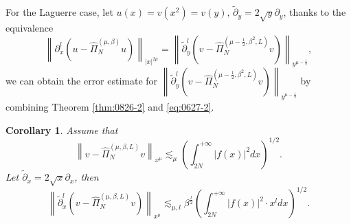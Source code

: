 \documentclass[pdflatex,sn-aps]{sn-jnl}%
\theoremstyle{thmstyleone}%
\newtheorem{corollary}{Corollary}[section]
\theoremstyle{thmstyletwo}%
\theoremstyle{thmstylethree}%
\begin{document}
For the Laguerre case, let $u(x) = v(x^2) = v(y),\, \tilde{\partial}_y = 2\sqrt{y}\partial_y$, thanks to the equivalence
\begin{equation}\label{eq:0627-2}
  \left\|\partial_x^l\left(u-\widehat{\Pi}_{N}^{(\mu,\beta)} u\right)\right\|_{|x|^{2 \mu}}=\left\|\tilde{\partial}_y^l\left(v-\widehat{\Pi}_{N}^{(\mu-\frac{1}{2}, \beta^2, L)} v\right)\right\|_{y^{\mu-\frac{1}{2}}},
\end{equation}
we can obtain the error estimate for $\left\|\tilde{\partial}_y^l\left(v-\widehat{\Pi}_{N}^{(\mu-\frac{1}{2}, \beta^2, L)} v\right)\right\|_{y^{\mu-\frac{1}{2}}}$
by combining Theorem \ref{thm:0826-2} and \eqref{eq:0627-2}.
\begin{corollary}
  Assume that
  \begin{equation}\label{eq:1111-11}
    \left\|v-\widehat{\Pi}_N^{(\mu, \beta, L)} v\right\|_{x^{\mu}} \lesssim_\mu\left(\int_{2N}^{+\infty}|f(x)|^2 d x\right)^{1 / 2}.
  \end{equation}  
  Let $\tilde{\partial}_x = 2\sqrt{x}\partial_x$, then
  \begin{equation}\label{eq:1111-12}
    \left\|\tilde{\partial}_x^l\left(v-\widehat{\Pi}_N^{(\mu, \beta, L)} v\right)\right\|_{x^{\mu}} \lesssim_{\mu, l} 
    \beta^{\frac{l}{2}}\left(\int_{2N}^{+\infty} \left|f(x)\right|^2 \cdot x^l d x\right)^{1 / 2}.
  \end{equation}
\end{corollary}
\end{document}
